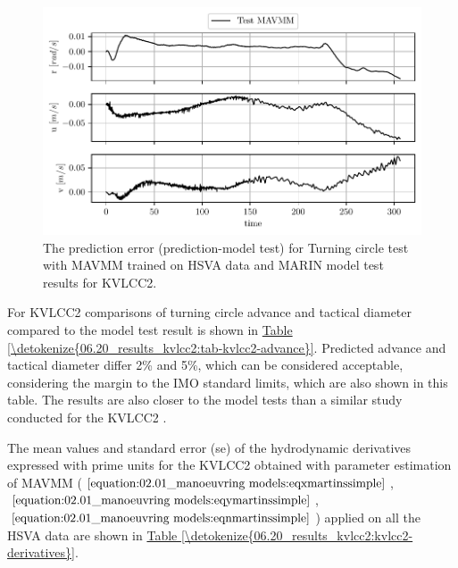 \begin{figure}[!htb]
\centering
\includegraphics{kappa/images/18.pdf}
\caption{The prediction error (prediction-model test) for Turning circle test with MAVMM trained on HSVA data and MARIN model test results for KVLCC2.}\label{\detokenize{06.20_results_kvlcc2:fig-kvlcc2-testing-sim-error}}\end{figure}
\noindent For KVLCC2 comparisons of turning circle advance and tactical diameter compared to the model test result is shown in \hyperref[\detokenize{06.20_results_kvlcc2:tab-kvlcc2-advance}]{Table \ref{\detokenize{06.20_results_kvlcc2:tab-kvlcc2-advance}}}. Predicted advance and tactical diameter differ 2\% and 5\%, which can be considered acceptable, considering the margin to the IMO standard limits, which are also shown in this table. The results are also closer to the model tests than a similar study conducted for the KVLCC2 \cite{he_nonparametric_2022}.


\noindent The mean values and standard error (se) of the hydrodynamic derivatives expressed with prime units for the KVLCC2 obtained with parameter estimation of MAVMM (\(\autoref{equation:02.01_manoeuvring models:eqxmartinssimple}\), \(\autoref{equation:02.01_manoeuvring models:eqymartinssimple}\), \(\autoref{equation:02.01_manoeuvring models:eqnmartinssimple}\)) applied on all the HSVA data are shown in \hyperref[\detokenize{06.20_results_kvlcc2:kvlcc2-derivatives}]{Table \ref{\detokenize{06.20_results_kvlcc2:kvlcc2-derivatives}}}.


\newpage
